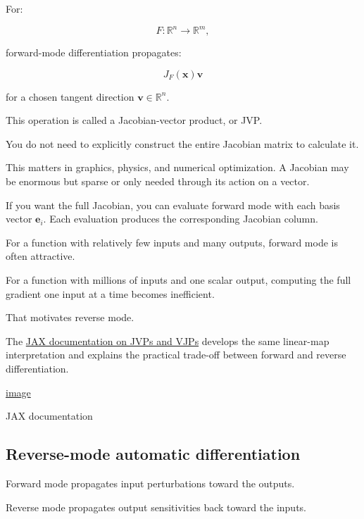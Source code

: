 \hypertarget{02-foundations-ii-ch022-generalization-jacobian-vector-products}{}

For:

\[
F:\mathbb R^n\rightarrow\mathbb R^m,
\]

forward-mode differentiation propagates:

\[
\boxed{ J_F(\mathbf x)\mathbf v }
\]

for a chosen tangent direction \(\mathbf v\in\mathbb R^n\).

This operation is called a Jacobian-vector product, or JVP.

You do not need to explicitly construct the entire Jacobian matrix to calculate it.

This matters in graphics, physics, and numerical optimization. A Jacobian may be enormous but sparse or only needed through its action on a vector.

If you want the full Jacobian, you can evaluate forward mode with each basis vector \(\mathbf e_i\). Each evaluation produces the corresponding Jacobian column.

For a function with relatively few inputs and many outputs, forward mode is often attractive.

For a function with millions of inputs and one scalar output, computing the full gradient one input at a time becomes inefficient.

That motivates reverse mode.

The \href{https://docs.jax.dev/en/latest/jacobian-vector-products.html?utm_source=chatgpt.com}{JAX documentation on JVPs and VJPs} develops the same linear-map interpretation and explains the practical trade-off between forward and reverse differentiation. 

\href{https://www.google.com/s2/favicons?domain=https://docs.jax.dev&sz=32}{image}

JAX documentation

\subsection{Reverse-mode automatic differentiation}\label{02-foundations-ii-ch022-reverse-mode-automatic-differentiation}

\hypertarget{02-foundations-ii-ch022-reverse-mode-automatic-differentiation}{}

Forward mode propagates input perturbations toward the outputs.

Reverse mode propagates output sensitivities back toward the inputs.

